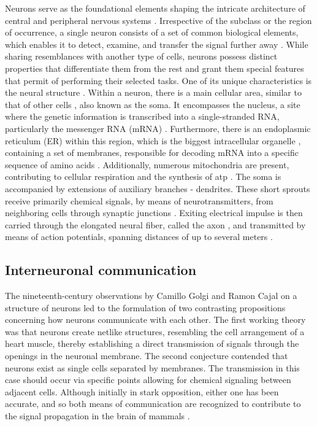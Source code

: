 \documentclass[class={myRUCProject}, crop=false]{standalone}
\begin{document}
Neurons serve as the foundational elements shaping the intricate architecture of central and peripheral nervous systems \cite{shadizadeh2022investigating}. 
Irrespective of the subclass or the region of occurrence, a single neuron consists of a set of common biological elements, which enables it to detect, examine, and transfer the signal further away \cite{SHOYKHET2011783}. While sharing resemblances with another type of cells, neurons possess distinct properties that differentiate them from the rest and grant them special features that permit of performing their selected tasks. One of its unique characteristics is the neural structure \cite{lovinger2008communication}. 
Within a neuron, there is a main cellular area, similar to that of other cells \cite{lovinger2008communication}, also known as the soma. It encompasses the nucleus, a site where the genetic information is transcribed into a single-stranded RNA, particularly the messenger RNA (mRNA) \cite{SHOYKHET2011783}. 
Furthermore, there is an endoplasmic reticulum (ER) within this region, which is the biggest intracellular organelle \cite{choi2006regional}, containing a set of membranes, responsible for decoding mRNA into a specific sequence of amino acids \cite{SHOYKHET2011783,??}. 
Additionally, numerous mitochondria are present, contributing to cellular respiration and the synthesis of \gls{atp} \cite{SHOYKHET2011783}. 
The soma is accompanied by extensions of auxiliary branches - dendrites. These short sprouts receive primarily chemical signals, by means of neurotransmitters, from neighboring cells through synaptic junctions \cite{lovinger2008communication,SHOYKHET2011783}. 
Exiting electrical impulse is then carried through the elongated neural fiber, called the axon \cite{njitacke2020hidden}, and transmitted by means of action potentials, spanning distances of up to several meters \cite{SHOYKHET2011783}.

\subsection*{Interneuronal communication}

The nineteenth-century observations by Camillo Golgi and Ramon Cajal on a structure of neurons led to the formulation of two contrasting propositions concerning how neurons communicate with each other. The first working theory was that neurons create netlike structures, resembling the cell arrangement of a heart muscle, thereby establishing a direct transmission of signals through the openings in the neuronal membrane. The second conjecture contended that neurons exist as single cells separated by membranes. The transmission in this case should occur via specific points allowing for chemical signaling between adjacent cells. Although initially in stark opposition, either one has been accurate, and so both means of communication are recognized to contribute to the signal propagation in the brain of mammals \cite{SHOYKHET2011783}.
\end{document}
